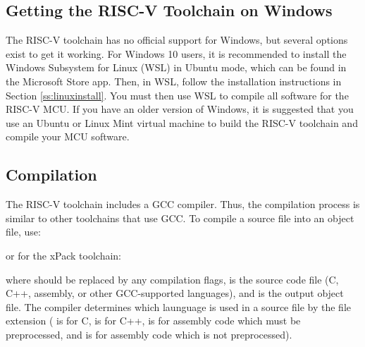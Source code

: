 \documentclass[11pt,pdftex,portrait,letterpaper]{article}
\begin{document}
\subsection{Getting the RISC-V Toolchain on Windows}
The RISC-V toolchain has no official support for Windows, but several options exist to get it working. For Windows 10 users, it is recommended to install the Windows Subsystem for Linux (WSL) in Ubuntu mode, which can be found in the Microsoft Store app. Then, in WSL, follow the installation instructions in Section \ref{ss:linuxinstall}. You must then use WSL to compile all software for the RISC-V MCU.
If you have an older version of Windows, it is suggested that you use an Ubuntu or Linux Mint virtual machine to build the RISC-V toolchain and compile your MCU software.

\subsection{Compilation}
The RISC-V toolchain includes a GCC compiler. Thus, the compilation process is similar to other toolchains that use GCC. To compile a source file into an object file, use:

\noindent{}

\noindent or for the xPack toolchain:

\noindent{}

\noindent where  should be replaced by any compilation flags,  is the source code file (C, C++, assembly, or other GCC-supported languages), and  is the output object file. The compiler determines which launguage is used in a source file by the file extension ( is for C,  is for C++,  is for assembly code which must be preprocessed, and  is for assembly code which is not preprocessed).
\end{document}
